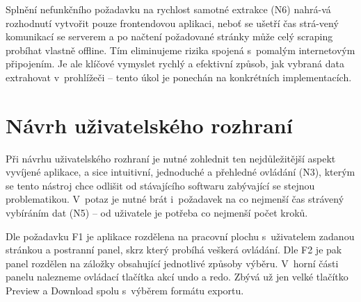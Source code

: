 \documentclass[thesis=B,czech]{FITthesis}[2012/06/26]
\begin{document}
Splnění nefunkčního požadavku na rychlost samotné extrakce (N6) nahrá-vá rozhodnutí vytvořit pouze frontendovou aplikaci, neboť se ušetří čas strá-vený komunikací se serverem a po načtení požadované stránky může celý scraping probíhat vlastně offline. Tím eliminujeme rizika spojená s~pomalým internetovým připojením. Je ale klíčové vymyslet rychlý a efektivní způsob, jak vybraná data extrahovat v~prohlížeči -- tento úkol je ponechán na konkrétních implementacích.

\newpage
\section{Návrh uživatelského rozhraní}
Při návrhu uživatelského rozhraní je nutné zohlednit ten nejdůležitější aspekt vyvíjené aplikace, a sice intuitivní, jednoduché a přehledné ovládání (N3), kterým se tento nástroj chce odlišit od stávajícího softwaru zabývající se stejnou problematikou. V~potaz je nutné brát i~požadavek na co nejmenší čas strávený vybíráním dat (N5) -- od uživatele je potřeba co nejmenší počet kroků.

Dle požadavku F1 je aplikace rozdělena na pracovní plochu s~uživatelem zadanou stránkou a postranní panel, skrz který probíhá veškerá ovládání. Dle F2 je pak panel rozdělen na záložky obsahující jednotlivé způsoby výběru. V~horní části panelu nalezneme ovládací tlačítka akcí undo a redo. Zbývá už jen velké tlačítko \textsf{Preview} a \textsf{Download} spolu s~výběrem formátu exportu.
\end{document}
